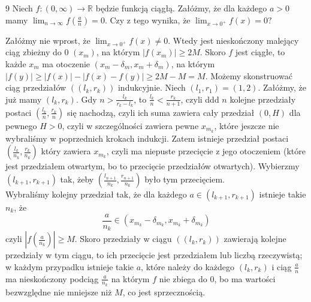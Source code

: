 \documentclass{../note}
\begin{document}
\begin{zadanie}{9}
Niech $f:(0,\infty)\rightarrow\mathbb{R}$ będzie funkcją ciągłą. Załóżmy, że dla każdego $a>0$ mamy $\lim_{n\rightarrow\infty}f\left(\frac{a}{n}\right)=0$. Czy z tego wynika, że $\lim_{x\rightarrow 0^{+}}f(x)=0?$
\end{zadanie}
\begin{rozwiazanie}
Załóżmy nie wprost, że $\lim_{x\rightarrow 0^{+}}f(x)\neq 0$. Wtedy jest nieskończony malejący ciąg zbieżny do 0 $(x_m)$, na którym $|f(x_m)| \geq 2M$. Skoro $f$ jest ciągłe, to każde $x_m$ ma otoczenie $(x_m - \delta_m, x_m + \delta_m)$, na którym $|f(y)| \geq |f(x)| - |f(x) - f(y)| \geq 2M - M = M$. Możemy skonstruować ciąg przedziałów $((l_k, r_k))$ indukcyjnie. Niech $(l_1, r_1) = (1, 2)$. Załóżmy, że już mamy $(l_k, r_k)$. Gdy $n > \frac{l_k}{r_k-l_k}$, to $\frac{l_k}{n} < \frac{r_k}{n+1}$, czyli ddd $n$ kolejne przedziały postaci $(\frac{l_k}{n}, \frac{r_k}{n})$ się nachodzą, czyli ich suma zawiera cały przedział $(0, H)$ dla pewnego $H>0$, czyli w szczególności zawiera pewne $x_{m_k}$, które jeszcze nie wybraliśmy w poprzednich krokach indukcji. Zatem istnieje przedział postaci $(\frac{l_k}{n_k}, \frac{r_k}{n_k})$ który zawiera $x_{m_k}$, czyli ma niepuste przecięcie z jego otoczeniem (które jest przedziałem otwartym, bo to przecięcie przedziałów otwartych). Wybierzmy $(l_{k+1}, r_{k+1})$ tak, żeby $(\frac{l_{n+1}}{n_k}, \frac{r_{n+1}}{n_k})$ było tym przecięciem.\\
Wybraliśmy kolejny przedział tak, że dla każdego $a \in (l_{k+1}, r_{k+1})$ istnieje takie $n_k$, że
\[\frac{a}{n_k} \in (x_{m_k} - \delta_{m_k}, x_{m_k} + \delta_{m_k})\]
czyli $\left|f\left(\frac{a}{n_k}\right)\right| \geq M$. Skoro przedziały w ciągu $((l_k, r_k))$ zawierają kolejne przedziały w tym ciągu, to ich przecięcie jest przedziałem lub liczbą rzeczywistą; w każdym przypadku istnieje takie $a$, które należy do każdego $(l_k, r_k)$ i ciąg $\frac{a}{n}$ ma nieskończony podciąg $\frac{a}{n_k}$ na którym $f$ nie zbiega do $0$, bo ma wartości bezwzględne nie mniejsze niż $M$, co jest sprzecznością.
\end{rozwiazanie}
\end{document}

